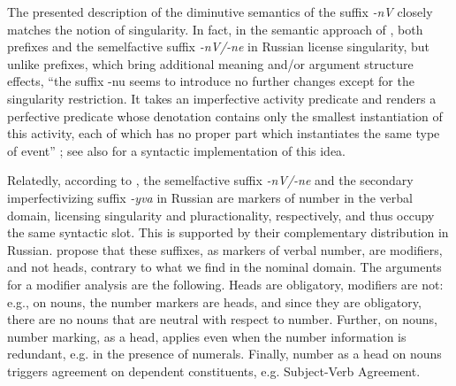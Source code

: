 \documentclass[output=paper,colorlinks,citecolor=brown]{langscibook}
\begin{document}
The presented description of the diminutive semantics of the suffix \textit{-nV} closely matches the notion of singularity. In fact, in the semantic approach of \citet{Kagan2008, Kagan2010}, both prefixes and the semelfactive suffix \textit{-nV/-ne} in Russian license singularity, but unlike prefixes, which bring additional meaning and/or argument structure effects, “the suffix -nu seems to introduce no further changes except for the singularity restriction. It takes an imperfective activity predicate and renders a perfective predicate whose denotation contains only the smallest instantiation of this activity, each of which has no proper part which instantiates the same type of event” \citep[11]{Kagan2010}; see also \citet{Milosavljevic2023PhD} for a syntactic implementation of this idea.

Relatedly, according to \citet{Armoskaite2008}, the semelfactive suffix \textit{-nV/-ne} and the secondary imperfectivizing suffix \textit{-yva} in Russian are markers of number in the verbal domain, licensing singularity and pluractionality, respectively, and thus occupy the same syntactic slot. This is supported by their complementary distribution in Russian. \citeauthor{Armoskaite2008} propose that these suffixes, as markers of verbal number, are modifiers, and not heads, contrary to what we find in the nominal domain. The arguments for a modifier analysis are the following. Heads are obligatory, modifiers are not: e.g., on nouns, the number markers are heads, and since they are obligatory, there are no nouns that are neutral with respect to number. Further, on nouns, number marking, as a head, applies even when the number information is redundant, e.g. in the presence of numerals. Finally, number as a head on nouns triggers agreement on dependent constituents, e.g. Subject-Verb Agreement. 
\end{document}
